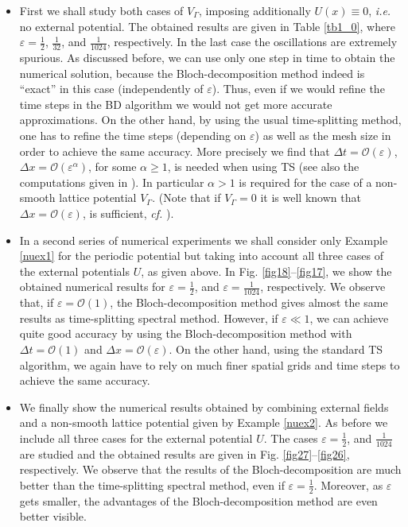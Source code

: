 \documentclass[leqno,final]{siamltex}
\numberwithin{equation}{section}
\newcounter{me}
\begin{document}
\begin{itemize}
\item First we shall study both cases of $V_\Gamma$, imposing
additionally $U(x)\equiv0$, {{\sl i.e.\/ }} no external potential. The
obtained results are given in Table \ref{tb1_0}, where ${{\varepsilon }}=
{\frac{{1}}{{2}}}$, ${\frac{{1}}{{32}}}$, and ${\frac{{1}}{{1024}}}$, respectively. In the
last case the oscillations are extremely spurious. As discussed
before, we can use only one step in time to obtain the numerical
solution, because the Bloch-decomposition method indeed is
``exact'' in this case (independently of ${{\varepsilon }}$). Thus, even if we
would refine the time steps in the BD algorithm we would not get
more accurate approximations. On the other hand, by using the
usual time-splitting method, one has to refine the time steps
(depending on ${{\varepsilon }}$) as well as the mesh size in order to achieve
the same accuracy. More precisely we find that $\Delta t={\mathcal O}({{\varepsilon }})$,
$\Delta x={\mathcal O}({{\varepsilon }}^\alpha)$, for some $\alpha \geq 1$, is needed when
using TS (see also the computations given in \cite{GoMa}). In
particular $\alpha > 1$ is required for the case of a non-smooth
lattice potential $V_\Gamma$. (Note that if $V_\Gamma = 0$ it is
well known that $\Delta x={\mathcal O}({{\varepsilon }})$, is sufficient, {{\sl cf.\/ }} \cite{BJM,
BJM1, HJMSZ}).

\item In a second series of numerical experiments we shall
consider only Example \ref{nuex1} for the periodic potential but
taking into account all three cases of the external potentials
$U$, as given above. In Fig. \ref{fig18}--\ref{fig17}, we show the
obtained numerical results for ${{\varepsilon }}={\frac{{1}}{{2}}}$,  and ${{\varepsilon }} =
{\frac{{1}}{{1024}}}$, respectively. We observe that, if ${{\varepsilon }}={\mathcal O}(1)$, the
Bloch-decomposition method gives almost the same results as
time-splitting spectral method. However, if ${{\varepsilon }}\ll 1$, we can
achieve quite good accuracy by using the Bloch-decomposition
method with $\Delta t={\mathcal O}(1)$ and $\Delta x={\mathcal O}({{\varepsilon }})$. On the other
hand, using the standard TS algorithm, we again have to rely on
much finer spatial grids and time steps to achieve the same
accuracy. \item We finally show the numerical results obtained by
combining external fields and a non-smooth lattice potential given
by Example \ref{nuex2}. As before we include all three cases for
the external potential $U$. The cases ${{\varepsilon }}={\frac{{1}}{{2}}}$, and
${\frac{{1}}{{1024}}}$ are studied and the obtained results are given in
Fig. \ref{fig27}--\ref{fig26}, respectively. We observe that the
results of the Bloch-decomposition are much better than the
time-splitting spectral method, even if ${{\varepsilon }} = {\frac{{1}}{{2}}}$. Moreover,
as ${{\varepsilon }}$ gets smaller, the advantages of the Bloch-decomposition
method are even better visible.
\end{itemize}
\end{document}
